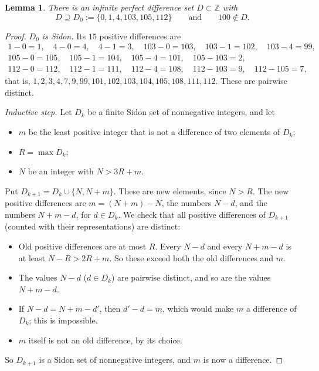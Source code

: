 \documentclass[11pt]{article}
\newtheorem{lemma}[theorem]{Lemma}
\theoremstyle{definition}
\theoremstyle{remark}
\newcommand{\Z}{\mathbb{Z}}
\begin{document}
\begin{lemma}\label{lem:diffset}
There is an infinite perfect difference set $D\subset\Z$ with
\[
D\supseteq D_0:=\{0,1,4,103,105,112\}\qquad\text{and}\qquad 100\notin D.
\]
\end{lemma}
\begin{proof}
\emph{$D_0$ is Sidon.} Its $15$ positive differences are
\[
\begin{gathered}
1-0=1,\quad 4-0=4,\quad 4-1=3,\quad 103-0=103,\quad 103-1=102,\quad 103-4=99,\\
105-0=105,\quad 105-1=104,\quad 105-4=101,\quad 105-103=2,\\
112-0=112,\quad 112-1=111,\quad 112-4=108,\quad 112-103=9,\quad 112-105=7,
\end{gathered}
\]
that is, $1,2,3,4,7,9,99,101,102,103,104,105,108,111,112$. These are pairwise distinct.

\emph{Inductive step.} Let $D_k$ be a finite Sidon set of nonnegative integers, and let
\begin{itemize}[nosep]
\item $m$ be the least positive integer that is not a difference of two elements of $D_k$;
\item $R=\max D_k$;
\item $N$ be an integer with $N>3R+m$.
\end{itemize}
Put $D_{k+1}=D_k\cup\{N,N+m\}$. These are new elements, since $N>R$. The new positive differences are $m=(N+m)-N$, the numbers $N-d$, and the numbers $N+m-d$, for $d\in D_k$. We check that all positive differences of $D_{k+1}$ (counted with their representations) are distinct:
\begin{itemize}[nosep]
\item Old positive differences are at most $R$. Every $N-d$ and every $N+m-d$ is at least $N-R>2R+m$. So these exceed both the old differences and $m$.
\item The values $N-d$ ($d\in D_k$) are pairwise distinct, and so are the values $N+m-d$.
\item If $N-d=N+m-d'$, then $d'-d=m$, which would make $m$ a difference of $D_k$; this is impossible.
\item $m$ itself is not an old difference, by its choice.
\end{itemize}
So $D_{k+1}$ is a Sidon set of nonnegative integers, and $m$ is now a difference.


\end{proof}
\end{document}
